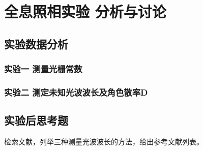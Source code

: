 \documentclass[dvipsnames, svgnames,a4paper,11pt]{article}
\begin{document}
\section{全息照相实验 \quad\heiti 分析与讨论}

\subsection{实验数据分析}

	\subsubsection{实验一 测量光栅常数}
	
		
	\subsubsection{实验二 测定未知光波波长及角色散率D}
			

			
\subsection{实验后思考题}



\begin{question}
	检索文献，列举三种测量光波波长的方法，给出参考文献列表。%
\end{question}
	

	
\end{document}
